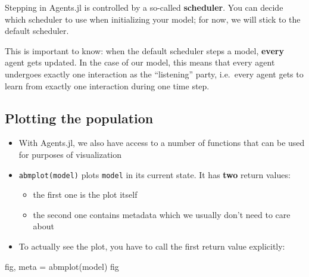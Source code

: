 \documentclass[
  letterpaper,
  DIV=11,
  numbers=noendperiod]{scrartcl}
\newenvironment{Shaded}{\begin{snugshade}}{\end{snugshade}}
\newcommand{\FunctionTok}[1]{\textcolor[rgb]{0.28,0.35,0.67}{#1}}
\newcommand{\NormalTok}[1]{\textcolor[rgb]{0.00,0.23,0.31}{#1}}
\newcommand{\OperatorTok}[1]{\textcolor[rgb]{0.37,0.37,0.37}{#1}}
\providecommand{\tightlist}{%
  \setlength{\itemsep}{0pt}\setlength{\parskip}{0pt}}\usepackage{longtable,booktabs,array}
\begin{document}
\begin{tcolorbox}[enhanced jigsaw, breakable, title=\textcolor{quarto-callout-important-color}{\faExclamation}\hspace{0.5em}{Important}, bottomrule=.15mm, coltitle=black, toprule=.15mm, titlerule=0mm, colframe=quarto-callout-important-color-frame, toptitle=1mm, opacityback=0, colbacktitle=quarto-callout-important-color!10!white, rightrule=.15mm, bottomtitle=1mm, arc=.35mm, leftrule=.75mm, opacitybacktitle=0.6, colback=white, left=2mm]

Stepping in Agents.jl is controlled by a so-called \textbf{scheduler}.
You can decide which scheduler to use when initializing your model; for
now, we will stick to the default scheduler.

This is important to know: when the default scheduler steps a model,
\textbf{every} agent gets updated. In the case of our model, this means
that every agent undergoes exactly one interaction as the ``listening''
party, i.e.~every agent gets to learn from exactly one interaction
during one time step.

\end{tcolorbox}

\subsection{Plotting the population}\label{plotting-the-population}

\begin{itemize}
\tightlist
\item
  With Agents.jl, we also have access to a number of functions that can
  be used for purposes of visualization
\item
  \texttt{abmplot(model)} plots \texttt{model} in its current state. It
  has \textbf{two} return values:

  \begin{itemize}
  \tightlist
  \item
    the first one is the plot itself
  \item
    the second one contains metadata which we usually don't need to care
    about
  \end{itemize}
\item
  To actually see the plot, you have to call the first return value
  explicitly:
\end{itemize}

\begin{Shaded}
\begin{Highlighting}[]
\NormalTok{fig, meta }\OperatorTok{=} \FunctionTok{abmplot}\NormalTok{(model)}
\NormalTok{fig}
\end{Highlighting}
\end{Shaded}
\end{document}
